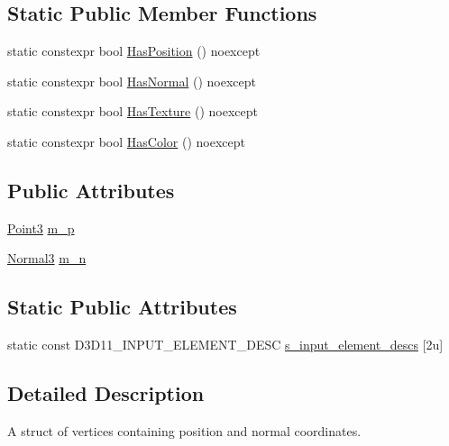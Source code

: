 \subsection*{Static Public Member Functions}
\begin{DoxyCompactItemize}
\item 
static constexpr bool \mbox{\hyperlink{structmage_1_1rendering_1_1_vertex_position_normal_a90efd74233b76b071a322d737caf3abf}{Has\+Position}} () noexcept
\item 
static constexpr bool \mbox{\hyperlink{structmage_1_1rendering_1_1_vertex_position_normal_af5a32a3e51ce13c36b665f83f40209b6}{Has\+Normal}} () noexcept
\item 
static constexpr bool \mbox{\hyperlink{structmage_1_1rendering_1_1_vertex_position_normal_a40b091a64d0b5b2c2a07b382cd546589}{Has\+Texture}} () noexcept
\item 
static constexpr bool \mbox{\hyperlink{structmage_1_1rendering_1_1_vertex_position_normal_aead42377c86418475bb7b4c93398cd34}{Has\+Color}} () noexcept
\end{DoxyCompactItemize}
\subsection*{Public Attributes}
\begin{DoxyCompactItemize}
\item 
\mbox{\hyperlink{structmage_1_1_point3}{Point3}} \mbox{\hyperlink{structmage_1_1rendering_1_1_vertex_position_normal_a14824f61c8740e3472fccff1e3678515}{m\+\_\+p}}
\item 
\mbox{\hyperlink{structmage_1_1_normal3}{Normal3}} \mbox{\hyperlink{structmage_1_1rendering_1_1_vertex_position_normal_a5955e74eca6ef6c7516e6664370f8598}{m\+\_\+n}}
\end{DoxyCompactItemize}
\subsection*{Static Public Attributes}
\begin{DoxyCompactItemize}
\item 
static const D3\+D11\+\_\+\+I\+N\+P\+U\+T\+\_\+\+E\+L\+E\+M\+E\+N\+T\+\_\+\+D\+E\+SC \mbox{\hyperlink{structmage_1_1rendering_1_1_vertex_position_normal_a15116a834c4065e277de0e7d4299fee0}{s\+\_\+input\+\_\+element\+\_\+descs}} \mbox{[}2u\mbox{]}
\end{DoxyCompactItemize}


\subsection{Detailed Description}
A struct of vertices containing position and normal coordinates. 


